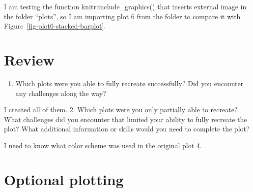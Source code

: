 \documentclass[
  man,
  floatsintext,
  longtable,
  nolmodern,
  notxfonts,
  notimes,
  colorlinks=true,linkcolor=blue,citecolor=blue,urlcolor=blue]{apa7}
\providecommand{\tightlist}{%
  \setlength{\itemsep}{0pt}\setlength{\parskip}{0pt}}
\begin{document}
I am testing the function knitr:include\_graphics() that inserts
external image in the folder ``plots'', so I am importing plot 6 from
the folder to compare it with Figure~\ref{fig-plot6-stacked-barplot}.

\begin{figure}[H]

\caption{\label{fig-plot6-for-comparison}}


\end{figure}%

\section{Review}\label{review}

\begin{enumerate}
\def\labelenumi{\arabic{enumi}.}
\tightlist
\item
  Which plots were you able to fully recreate successfully? Did you
  encounter any challenges along the way?
\end{enumerate}

I created all of them. 2. Which plots were you only partially able to
recreate? What challenges did you encounter that limited your ability to
fully recreate the plot? What additional information or skills would you
need to complete the plot?

I need to know what color scheme was used in the original plot 4.

\section{Optional plotting}\label{optional-plotting}
\end{document}
